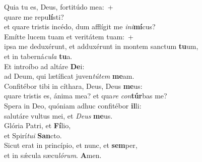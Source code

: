 \evenverse Quia tu es, Deus, fortitúdo mea:~+\\\evenverse  quare me repu\textbf{lí}sti?~\*\\
\evenverse et quare tristis incédo, dum afflígit me \textit{i}\textit{ni}\textbf{mí}cus?\\
\oddverse Emítte lucem tuam et veritátem tuam:~+\\
\oddverse  ipsa me deduxérunt, et adduxérunt in montem sanctum \textbf{tu}um,~\*\\
\oddverse et in taberná\textit{cu}\textit{la} \textbf{tu}a.\\
\evenverse Et introíbo ad altáre \textbf{De}i:~\*\\
\evenverse ad Deum, qui lætíficat juven\textit{tú}\textit{tem} \textbf{me}am.\\
\oddverse Confitébor tibi in cíthara, Deus, Deus \textbf{me}us:~\*\\
\oddverse quare tristis es, ánima mea? et qua\textit{re} \textit{con}\textbf{túr}bas me?\\
\evenverse Spera in Deo, quóniam adhuc confitébor \textbf{il}li:~\*\\
\evenverse salutáre vultus mei, et \textit{De}\textit{us} \textbf{me}us.\\
\oddverse Glória Patri, et \textbf{Fí}lio,~\*\\
\oddverse et Spirí\textit{tu}\textit{i} \textbf{San}cto.\\
\evenverse Sicut erat in princípio, et nunc, et \textbf{sem}per,~\*\\
\evenverse et in sǽcula sæcu\textit{ló}\textit{rum}. \textbf{A}men.\\
